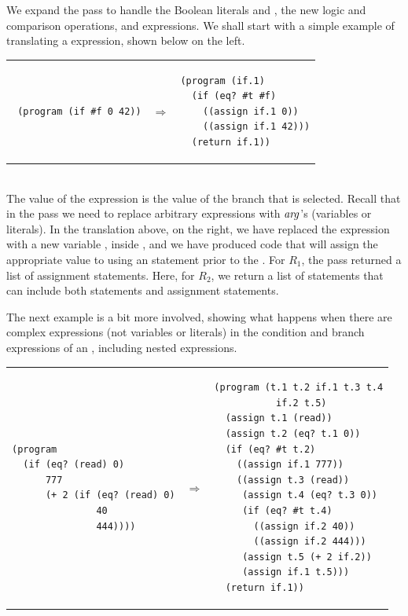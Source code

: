 \documentclass[11pt]{book}
\begin{document}
We expand the  pass to handle the Boolean literals
 and , the new logic and comparison operations, and
 expressions. We shall start with a simple example of
translating a  expression, shown below on the left. \\
\begin{tabular}{lll}
\begin{minipage}{0.4\textwidth}
\begin{lstlisting}
 (program (if #f 0 42))
\end{lstlisting}
\end{minipage}
&
$\Rightarrow$
&
\begin{minipage}{0.4\textwidth}
\begin{lstlisting}
(program (if.1)
  (if (eq? #t #f)
    ((assign if.1 0))
    ((assign if.1 42)))
  (return if.1))
\end{lstlisting}
\end{minipage}
\end{tabular} \\
The value of the  expression is the value of the branch that
is selected. Recall that in the  pass we need to replace
arbitrary expressions with $\mathit{arg}$'s (variables or literals). In the
translation above, on the right, we have replaced the 
expression with a new variable , inside , and we have produced code that will assign the appropriate
value to  using an  statement prior to the
.  For $R_1$, the  pass returned a list of
assignment statements. Here, for $R_2$, we return a list of statements
that can include both  statements and assignment statements.

The next example is a bit more involved, showing what happens when
there are complex expressions (not variables or literals) in the
condition and branch expressions of an , including nested
 expressions.

\begin{tabular}{lll}
\begin{minipage}{0.4\textwidth}
\begin{lstlisting}
(program
  (if (eq? (read) 0)
      777
      (+ 2 (if (eq? (read) 0)
               40
               444))))
\end{lstlisting}
\end{minipage}
&
$\Rightarrow$
&
\begin{minipage}{0.4\textwidth}
\begin{lstlisting}
(program (t.1 t.2 if.1 t.3 t.4
           if.2 t.5)
  (assign t.1 (read))
  (assign t.2 (eq? t.1 0))
  (if (eq? #t t.2)
    ((assign if.1 777))
    ((assign t.3 (read))
     (assign t.4 (eq? t.3 0))
     (if (eq? #t t.4)
       ((assign if.2 40))
       ((assign if.2 444)))
     (assign t.5 (+ 2 if.2))
     (assign if.1 t.5)))
  (return if.1))
\end{lstlisting}
\end{minipage}
\end{tabular} \\
\end{document}
